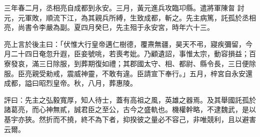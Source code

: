 \begin{pinyinscope}
 
三年春二月，丞相亮自成都到永安。三月，黃元進兵攻臨卭縣。遣將軍陳曶
 討元，元軍敗，順流下江，為其親兵所縛，生致成都，斬之。先主病篤，託孤於丞相亮，尚書令李嚴為副。夏四月癸巳，先主殂于永安宮，時年六十三。
 
 
亮上言於後主曰：「伏惟大行皇帝邁仁樹德，覆燾無疆，昊天不弔，寢疾彌留，今月二十四日奄忽升遐，臣妾號咷，若喪考妣。乃顧遺詔，事惟太宗，動容損益；百寮發哀，滿三日除服，到葬期復如禮；其郡國太守、相、都尉、縣令長，三日便除服。臣亮親受勑戒，震威神靈，不敢有違。臣請宣下奉行。」五月，梓宮自永安還成都，謚曰昭烈皇帝。秋，八月，葬惠陵。
 
 
 
 
 評曰：先主之弘毅寬厚，知人待士，蓋有高祖之風，英雄之器焉。及其舉國託孤於諸葛亮，而心神無貳，誠君臣之至公，古今之盛軌也。機權幹略，不逮魏武，是以基宇亦狹。然折而不撓，終不為下者，抑揆彼之量必不容己，非唯競利，且以避害云爾。
 
 
\end{pinyinscope}